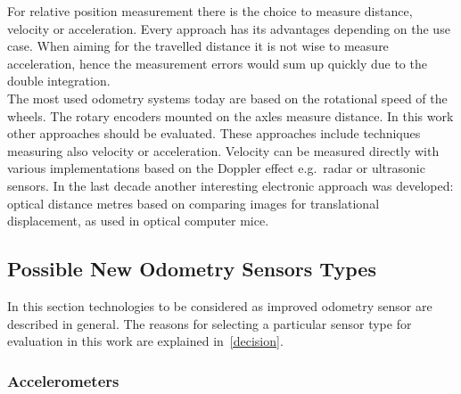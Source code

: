 \documentclass[12pt,a4paper]{article}
\begin{document}
For relative position measurement there is the choice to measure distance, velocity or acceleration.
Every approach has its advantages depending on the use case.
When aiming for the travelled distance it is not wise to measure acceleration, hence the measurement errors would sum up quickly due to the double integration.\\
The most used odometry systems today are based on the rotational speed of the wheels.
The rotary encoders mounted on the axles measure distance.
In this work other approaches should be evaluated. 
These approaches include techniques measuring also velocity or acceleration.
Velocity can be measured directly with various implementations based on the Doppler effect e.g.\ radar or ultrasonic sensors.
In the last decade another interesting electronic approach was developed: optical distance metres based on comparing images for translational displacement, as used in optical computer mice.

\subsection{Possible New Odometry Sensors Types}
\label{ssec:ntypes}

In this section technologies to be considered as improved odometry sensor are described in general.
The reasons for selecting a particular sensor type for evaluation in this work are explained in~\autoref{decision}.


\subsubsection{Accelerometers}
\end{document}
